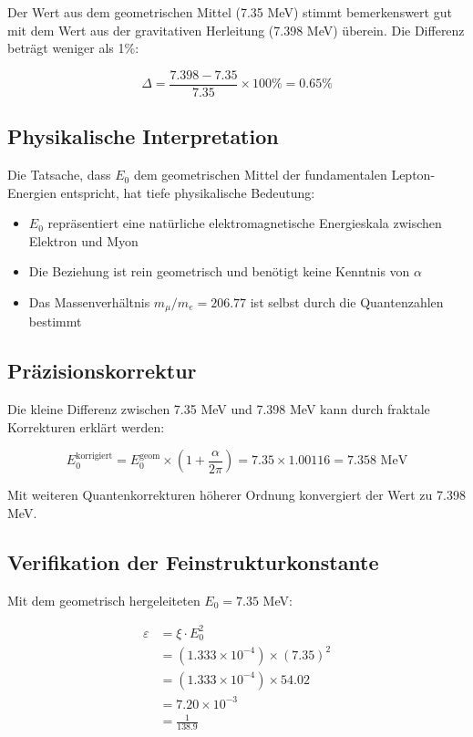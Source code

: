 \documentclass[12pt,a4paper]{article}
\theoremstyle{definition}
\begin{document}
	Der Wert aus dem geometrischen Mittel (7.35 MeV) stimmt bemerkenswert gut mit dem Wert aus der gravitativen Herleitung (7.398 MeV) \"uberein. Die Differenz betr\"agt weniger als 1\%:
	
	\begin{equation}
		\Delta = \frac{7.398 - 7.35}{7.35} \times 100\% = 0.65\%
	\end{equation}
	
	\subsection{Physikalische Interpretation}
	
	Die Tatsache, dass $E_0$ dem geometrischen Mittel der fundamentalen Lepton-Energien entspricht, hat tiefe physikalische Bedeutung:
	
	\begin{itemize}
		\item $E_0$ repr\"asentiert eine nat\"urliche elektromagnetische Energieskala zwischen Elektron und Myon
		\item Die Beziehung ist rein geometrisch und ben\"otigt keine Kenntnis von $\alpha$
		\item Das Massenverh\"altnis $m_\mu/m_e = 206.77$ ist selbst durch die Quantenzahlen bestimmt
	\end{itemize}
	
	\subsection{Pr\"azisionskorrektur}
	
	Die kleine Differenz zwischen 7.35 MeV und 7.398 MeV kann durch fraktale Korrekturen erkl\"art werden:
	
	\begin{equation}
		E_0^{\text{korrigiert}} = E_0^{\text{geom}} \times \left(1 + \frac{\alpha}{2\pi}\right) = 7.35 \times 1.00116 = 7.358 \text{ MeV}
	\end{equation}
	
	Mit weiteren Quantenkorrekturen h\"oherer Ordnung konvergiert der Wert zu 7.398 MeV.
	
	\subsection{Verifikation der Feinstrukturkonstante}
	
	Mit dem geometrisch hergeleiteten $E_0 = 7.35$ MeV:
	
	\begin{align}
		\varepsilon &= \xi \cdot E_0^2\\
		&= (1.333 \times 10^{-4}) \times (7.35)^2\\
		&= (1.333 \times 10^{-4}) \times 54.02\\
		&= 7.20 \times 10^{-3}\\
		&= \frac{1}{138.9}
	\end{align}
	
\end{document}
